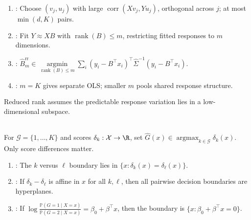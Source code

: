 \begin{method} \label{meth:sl-canonical-correlation-and-reduced-rank-regression} 
\begin{enumerate}[label=(\roman*)]
\setlength{\itemsep}{0pt}
\item {}: Choose $(v_j,u_j)$ with large $\operatorname{corr}(Xv_j,Yu_j)$, orthogonal across $j$; at most $\min(d,K)$ pairs.
\item {}: Fit $Y\approx XB$ with $\operatorname{rank}(B)\leq m$, restricting fitted responses to $m$ dimensions.
\item {}: $\widehat{B}^{\mathrm{rr}}_m\in\operatorname*{argmin}\limits_{\operatorname{rank}(B)\leq m}\sum\limits_i(y_i-B^\top x_i)^\top\widehat{\Sigma}^{-1}(y_i-B^\top x_i)$.
\item {}: $m=K$ gives separate OLS; smaller $m$ pools shared response structure.
\end{enumerate}
Reduced rank assumes the predictable response variation lies in a low-dimensional subspace.
\end{method}

\begin{definition} \label{def:sl-discriminant-functions-linear-boundaries} \\
For $\mathcal{G}=\{1,\ldots,K\}$ and scores $\delta_k:\mathcal{X}\to\R$, set $\widehat{G}(x)\in\operatorname*{argmax}_{k\in\mathcal{G}}\delta_k(x)$.  Only score differences matter.
\begin{enumerate}[label=(\roman*)]
\setlength{\itemsep}{0pt}
\item {}: The $k$ versus $\ell$ boundary lies in $\{x:\delta_k(x)=\delta_\ell(x)\}$.
\item {}: If $\delta_k-\delta_\ell$ is affine in $x$ for all $k,\ell$, then all pairwise decision boundaries are hyperplanes.
\item {}: If $\log\frac{\mathbb{P}(G=1\mid X=x)}{\mathbb{P}(G=2\mid X=x)}=\beta_0+\beta^\top x$, then the boundary is $\{x:\beta_0+\beta^\top x=0\}$.
\end{enumerate}
\end{definition}

